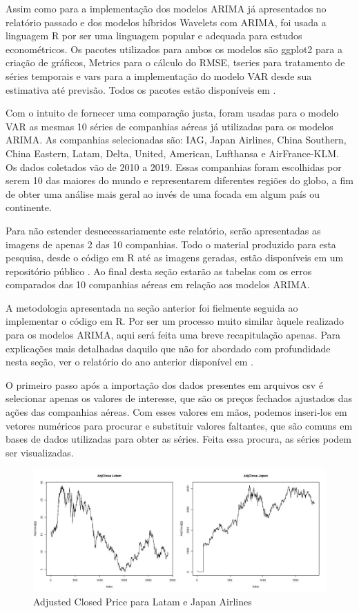 \documentclass[12pt]{article}
\begin{document}
	Assim como para a implementação dos modelos ARIMA já apresentados no relatório passado e dos modelos híbridos \textrm{Wavelets} com ARIMA, foi usada a linguagem R por ser uma linguagem popular e adequada para estudos econométricos. Os pacotes utilizados para ambos os modelos são \textrm{ggplot2} para a criação de gráficos, \textrm{Metrics} para o cálculo do RMSE, \textrm{tseries} para tratamento de séries temporais e \textrm{vars} para a implementação do modelo VAR desde sua estimativa até previsão. Todos os pacotes estão disponíveis em \cite{CRANR}.
	
	Com o intuito de fornecer uma comparação justa, foram usadas para o modelo VAR as mesmas 10 séries de companhias aéreas já utilizadas para os modelos ARIMA. As companhias selecionadas são: IAG, Japan Airlines, China Southern, China Eastern, Latam, Delta, United, American, Lufthansa e AirFrance-KLM. Os dados coletados vão de 2010 a 2019. Essas companhias foram escolhidas por serem 10 das maiores do mundo e representarem diferentes regiões do globo, a fim de obter uma análise mais geral ao invés de uma focada em algum país ou continente.
	
	Para não estender desnecessariamente este relatório, serão apresentadas as imagens de apenas 2 das 10 companhias. Todo o material produzido para esta pesquisa, desde o código em R até as imagens geradas, estão disponíveis em um repositório público \cite{git}. Ao final desta seção estarão as tabelas com os erros comparados das 10 companhias aéreas em relação aos modelos ARIMA.
	
	A metodologia apresentada na seção anterior foi fielmente seguida ao implementar o código em R. Por ser um processo muito similar àquele realizado para os modelos ARIMA, aqui será feita uma breve recapitulação apenas. Para explicações mais detalhadas daquilo que não for abordado com profundidade nesta seção, ver o relatório do ano anterior disponível em \cite{git}.
	
	O primeiro passo após a importação dos dados presentes em arquivos \textrm{csv} é selecionar apenas os valores de interesse, que são os preços fechados ajustados das ações das companhias aéreas. Com esses valores em mãos, podemos inseri-los em vetores numéricos para procurar e substituir valores faltantes, que são comuns em bases de dados utilizadas para obter as séries. Feita essa procura, as séries podem ser visualizadas.
	
	\begin{figure}[H]
		\centering
		\includegraphics[width=1.0\linewidth]{Imagens/AdjCloseVAR}
		\caption{Adjusted Closed Price para Latam e Japan Airlines}
		\label{fig:adjclosevar}
	\end{figure}
	 
\end{document}
